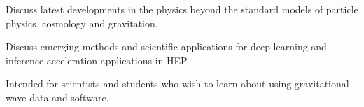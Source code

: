 {
{ Discuss latest developments in the physics beyond the standard models of particle physics, cosmology and gravitation.}{}


{ Discuss emerging methods and scientific applications for deep learning and inference acceleration applications in HEP.}{}

{ Intended for scientists and students who wish to learn about using gravitational-wave data and software.}{}


}



